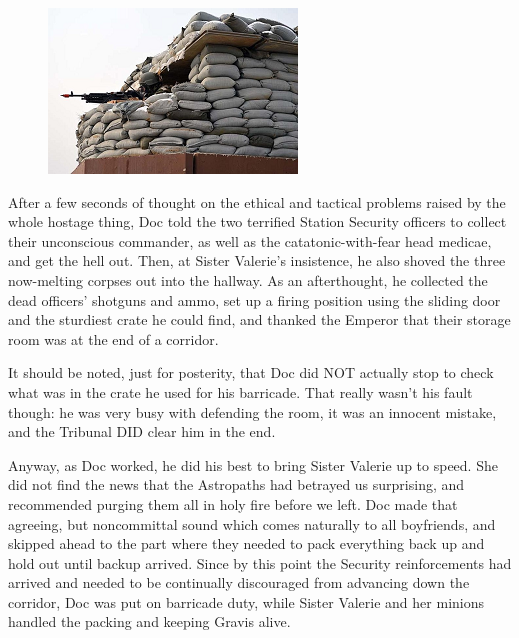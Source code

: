 \begin{figure}
	\begin{center}
		\includegraphics[width=\figwidth]{pics/14/34.png}
	\end{center}
\end{figure}
After a few seconds of thought on the ethical and tactical problems raised by the whole hostage thing, Doc told the two terrified Station Security officers to collect their unconscious commander, as well as the catatonic-with-fear head medicae, and get the hell out. 
Then, at Sister Valerie's insistence, he also shoved the three now-melting corpses out into the hallway. 
As an afterthought, he collected the dead officers' shotguns and ammo, set up a firing position using the sliding door and the sturdiest crate he could find, and thanked the Emperor that their storage room was at the end of a corridor. 


It should be noted, just for posterity, that Doc did NOT actually stop to check what was in the crate he used for his barricade. 
That really wasn't his fault though: 
he was very busy with defending the room, it was an innocent mistake, and the Tribunal DID clear him in the end.

Anyway, as Doc worked, he did his best to bring Sister Valerie up to speed. 
She did not find the news that the Astropaths had betrayed us surprising, and recommended purging them all in holy fire before we left. 
Doc made that agreeing, but noncommittal sound which comes naturally to all boyfriends, and skipped ahead to the part where they needed to pack everything back up and hold out until backup arrived. 
Since by this point the Security reinforcements had arrived and needed to be continually discouraged from advancing down the corridor, Doc was put on barricade duty, while Sister Valerie and her minions handled the packing and keeping Gravis alive.

